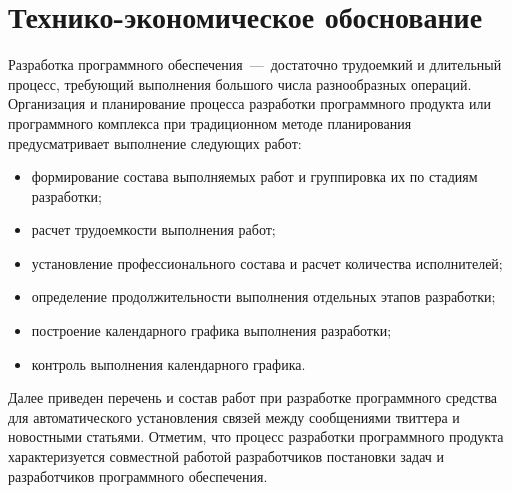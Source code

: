 \section{Технико-экономическое обоснование}
    Разработка программного обеспечения~---~достаточно трудоемкий и длительный процесс, требующий выполнения большого числа разнообразных операций.
    Организация и планирование процесса разработки программного продукта или программного комплекса при традиционном методе планирования предусматривает выполнение следующих работ:
    \begin{itemize}
        \item формирование состава выполняемых работ и группировка их по стадиям разработки;
        \item расчет трудоемкости выполнения работ;
        \item установление профессионального состава и расчет количества исполнителей;
        \item определение продолжительности выполнения отдельных этапов разработки;
        \item построение календарного графика выполнения разработки;
        \item контроль выполнения календарного графика.
    \end{itemize}

    Далее приведен перечень и состав работ при разработке программного средства для автоматического установления связей между сообщениями твиттера и новостными статьями.
    Отметим, что процесс разработки программного продукта характеризуется совместной работой разработчиков постановки задач и разработчиков программного обеспечения.

